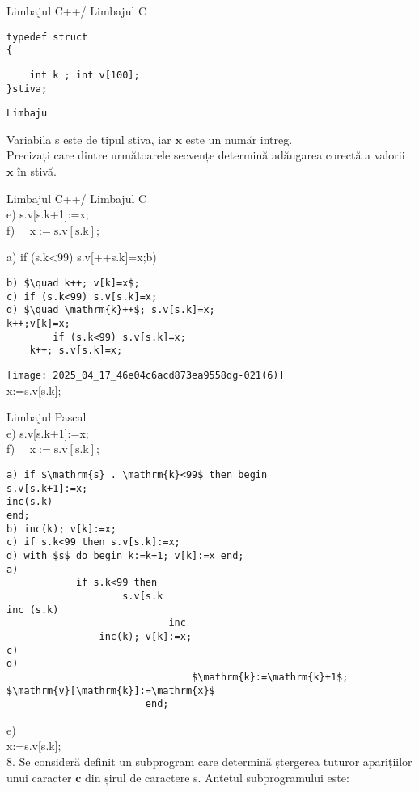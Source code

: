 Limbajul C++/ Limbajul C

\begin{verbatim}
typedef struct
{
\end{verbatim}

\begin{verbatim}
    int k ; int v[100];
}stiva;
\end{verbatim}

\begin{verbatim}
Limbaju
\end{verbatim}

Variabila s este de tipul stiva, iar $\mathbf{x}$ este un număr intreg.\\
Precizați care dintre următoarele secvențe determină adăugarea corectă a valorii $\mathbf{x}$ în stivă.

Limbajul C++/ Limbajul C\\[0pt]
e) s.v[s.k+1]:=x;\\
f) $\quad \mathrm{x}:=\mathrm{s} . \mathrm{v}[\mathrm{s} . \mathrm{k}]$;

a) if (s.k<99) s.v[++s.k]=x;b)

\begin{verbatim}
b) $\quad k++; v[k]=x$;
c) if (s.k<99) s.v[s.k]=x;
d) $\quad \mathrm{k}++$; s.v[s.k]=x;
k++;v[k]=x;
        if (s.k<99) s.v[s.k]=x;
    k++; s.v[s.k]=x;
\end{verbatim}

\texttt{[image: 2025\_04\_17\_46e04c6acd873ea9558dg-021(6)]}\\[0pt]
x:=s.v[s.k];

Limbajul Pascal\\[0pt]
e) s.v[s.k+1]:=x;\\
f) $\quad \mathrm{x}:=\mathrm{s} . \mathrm{v}[\mathrm{s} . \mathrm{k}]$;

\begin{verbatim}
a) if $\mathrm{s} . \mathrm{k}<99$ then begin
s.v[s.k+1]:=x;
inc(s.k)
end;
b) inc(k); v[k]:=x;
c) if s.k<99 then s.v[s.k]:=x;
d) with $s$ do begin k:=k+1; v[k]:=x end;
a)
            if s.k<99 then
                    s.v[s.k
inc (s.k)
                            inc
                inc(k); v[k]:=x;
c)
d)
                                $\mathrm{k}:=\mathrm{k}+1$; $\mathrm{v}[\mathrm{k}]:=\mathrm{x}$
                        end;
\end{verbatim}

e)\\[0pt]
x:=s.v[s.k];\\
8. Se consideră definit un subprogram care determină ștergerea tuturor aparițiilor unui caracter $\mathbf{c}$ din șirul de caractere s. Antetul subprogramului este:


